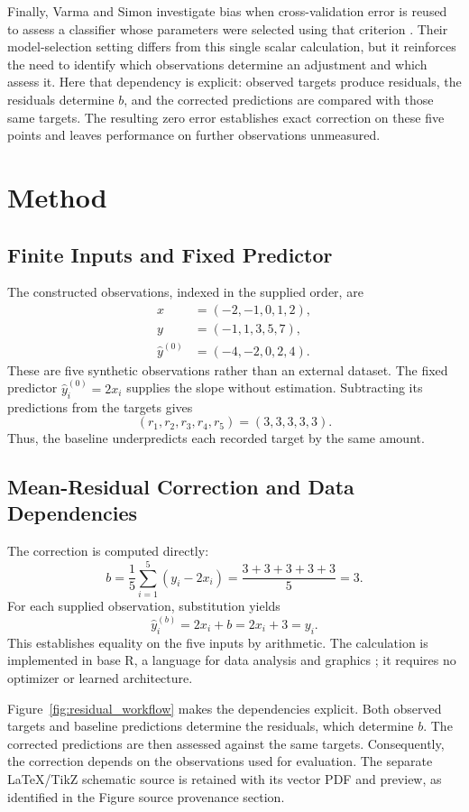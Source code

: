 \documentclass[11pt]{article}
\begin{document}
Finally, Varma and Simon investigate bias when cross-validation error is reused to assess a classifier whose parameters were selected using that criterion \cite{Varma2006BiasError}. Their model-selection setting differs from this single scalar calculation, but it reinforces the need to identify which observations determine an adjustment and which assess it. Here that dependency is explicit: observed targets produce residuals, the residuals determine $b$, and the corrected predictions are compared with those same targets. The resulting zero error establishes exact correction on these five points and leaves performance on further observations unmeasured.

\section{Method}

\subsection{Finite Inputs and Fixed Predictor}

The constructed observations, indexed in the supplied order, are
\[
\begin{aligned}
x&=(-2,-1,0,1,2),\\
y&=(-1,1,3,5,7),\\
\widehat{y}^{(0)}&=(-4,-2,0,2,4).
\end{aligned}
\]
These are five synthetic observations rather than an external dataset. The fixed predictor $\widehat{y}^{(0)}_i=2x_i$ supplies the slope without estimation. Subtracting its predictions from the targets gives
\[
(r_1,r_2,r_3,r_4,r_5)
=(3,3,3,3,3).
\]
Thus, the baseline underpredicts each recorded target by the same amount.

\subsection{Mean-Residual Correction and Data Dependencies}

The correction is computed directly:
\[
b=\frac{1}{5}\sum_{i=1}^{5}(y_i-2x_i)
=\frac{3+3+3+3+3}{5}=3.
\]
For each supplied observation, substitution yields
\[
\widehat{y}^{(b)}_i=2x_i+b=2x_i+3=y_i.
\]
This establishes equality on the five inputs by arithmetic. The calculation is implemented in base R, a language for data analysis and graphics \cite{Ihaka1996RLanguage}; it requires no optimizer or learned architecture.

Figure~\ref{fig:residual_workflow} makes the dependencies explicit. Both observed targets and baseline predictions determine the residuals, which determine $b$. The corrected predictions are then assessed against the same targets. Consequently, the correction depends on the observations used for evaluation. The separate LaTeX/TikZ schematic source is retained with its vector PDF and preview, as identified in the Figure source provenance section.
\end{document}

